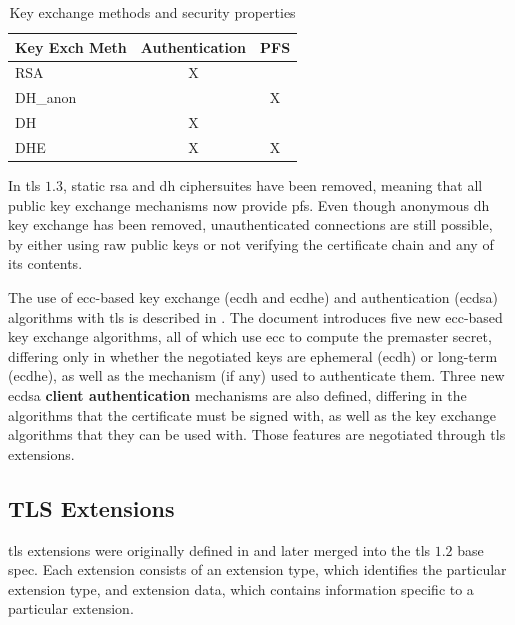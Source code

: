 \documentclass{llncs}
\begin{document}
\begin{table}[]
\centering
\caption{Key exchange methods and security properties}
\label{kemsp}
\begin{tabular}{|l|c|l|}
\hline
\textbf{Key Exch Meth} & \multicolumn{1}{l|}{Authentication} & PFS                    \\ \hline
RSA                          & X                                   &                        \\ \hline
DH\_anon                     & \multicolumn{1}{l|}{}               & \multicolumn{1}{c|}{X} \\ \hline
DH                           & X                                   &                        \\ \hline
DHE                          & X                                   & \multicolumn{1}{c|}{X} \\ \hline
\end{tabular}
\end{table}

In \gls{tls} $1.3$, static \gls{rsa} and \gls{dh} ciphersuites have been removed, meaning that all
public key exchange mechanisms now provide \gls{pfs}. Even though
anonymous \gls{dh} key exchange has been removed,
unauthenticated connections are still possible, by either using raw public keys\cite{RFC7250} or not verifying the certificate chain and any of its contents.

The use of \gls{ecc}-based key exchange (\gls{ecdh} and \gls{ecdhe}) and authentication (\gls{ecdsa})
algorithms with \gls{tls} is described in \cite{RFC4492}. The document introduces five new
\gls{ecc}-based key exchange algorithms, all of which use \gls{ecc} to compute
the premaster secret, differing only in whether the negotiated
keys are ephemeral (\gls{ecdh}) or long-term (\gls{ecdhe}), as well as the mechanism (if any) used to
authenticate them. Three new \gls{ecdsa} \textbf{client authentication} mechanisms are also defined,
differing in the algorithms that the certificate must be signed with, as well
as the key exchange algorithms that they can be used with.
Those features are negotiated through \gls{tls} extensions.

\subsection{TLS Extensions} \label{extensions}

\gls{tls} extensions were originally defined in \cite{RFC4366}
and later merged into the \gls{tls} $1.2$ base spec. Each extension consists of an
extension type, which identifies the particular extension type, and extension data,
which contains information specific to a particular extension.
\end{document}
